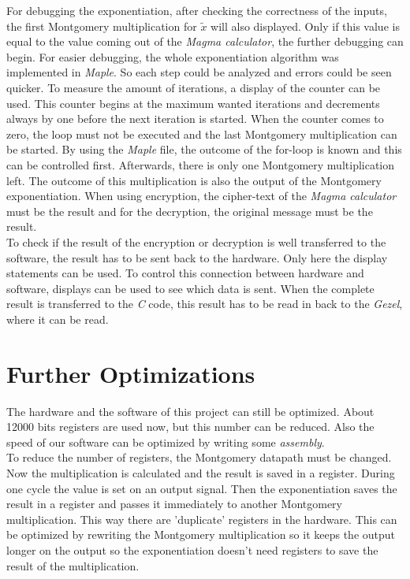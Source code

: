 \documentclass[a4paper]{article}
\begin{document}
For debugging the exponentiation, after checking the correctness of the inputs, the first Montgomery multiplication for $\tilde{x}$ will also displayed. Only if this value is equal to the value coming out of the \textit{Magma calculator}, the further debugging can begin. For easier debugging, the whole exponentiation algorithm was implemented in \textit{Maple}. So each step could be analyzed and errors could be seen quicker. To measure the amount of iterations, a display of the counter can be used. This counter begins at the maximum wanted iterations and decrements always by one before the next iteration is started. When the counter comes to zero, the loop must not be executed and the last Montgomery multiplication can be started. By using the \textit{Maple} file, the outcome of the for-loop is known and this can be controlled first. Afterwards, there is only one Montgomery multiplication left. The outcome of this multiplication is also the output of the Montgomery exponentiation. When using encryption, the cipher-text of the \textit{Magma calculator} must be the result and for the decryption, the original message must be the result.\\

To check if the result of the encryption or decryption is well transferred to the software, the result has to be sent back to the hardware. Only here the display statements can be used. To control this connection between hardware and software, displays can be used to see which data is sent. When the complete result is transferred to the \textit{C} code, this result has to be read in back to the \textit{Gezel}, where it can be read.

\section{Further Optimizations}

The hardware and the software of this project can still be optimized. About 12000 bits registers are used now, but this number can be reduced. Also the speed of our software can be optimized by writing some \textit{assembly}.\\

To reduce the number of registers, the Montgomery datapath must be changed. Now the multiplication is calculated and the result is saved in a register. During one cycle the value is set on an output signal. Then the exponentiation saves the result in a register and passes it immediately to another Montgomery multiplication. This way there are 'duplicate' registers in the hardware. This can be optimized by rewriting the Montgomery multiplication so it keeps the output longer on the output so the exponentiation doesn't need registers to save the result of the multiplication.\\
\end{document}
